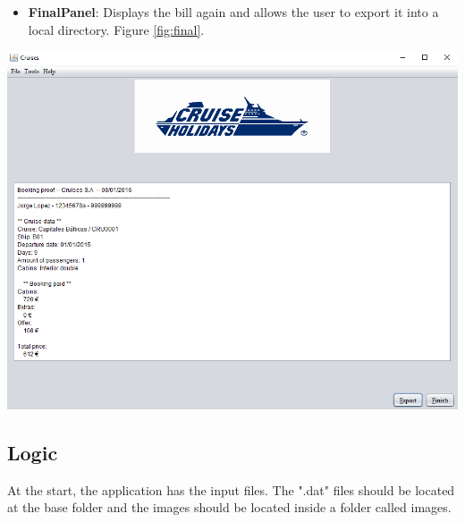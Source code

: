 \documentclass[11pt]{article}
\begin{document}
   	\begin{qn}
		\begin{itemize}
			\item \textbf{FinalPanel}: Displays the bill again and allows the user to export it into a local directory. Figure \ref{fig:final}.
		\end{itemize}   
		\begin{center}
			\begin{minipage}{0.8\linewidth}
				\includegraphics[width=\linewidth]{images/final.png}
				\label{fig:final}
			\end{minipage}
		\end{center}
	\end{qn}

   
	\subsection{Logic}
	At the start, the application has the input files. The ".dat" files should be located at the base folder and the images should be located inside a folder called images.
   
\end{document}
